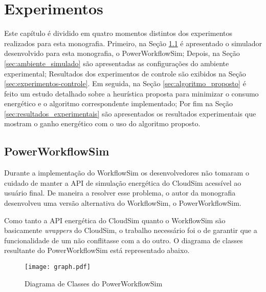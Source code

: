 \chapter{Experimentos}
\label{cap:experimentos}
Este capítulo é dividido em quatro momentos distintos dos experimentos realizados
para esta monografia. Primeiro, na Seção \ref{sec:powerworkflowsim} é
apresentado o simulador desenvolvido para esta monografia, o PowerWorkflowSim;
Depois, na Seção \ref{sec:ambiente_simulado} são
apresentadas as configurações do ambiente experimental; Resultados dos 
experimentos de controle são exibidos na Seção \ref{sec:experimentos-controle}.
Em seguida, na Seção
\ref{sec:algoritmo_proposto} é feito um estudo detalhado sobre a heurística
proposta para minimizar o consumo energético e o algoritmo correspondente
implementado; Por fim na Seção \ref{sec:resultados_experimentais} são
apresentados os resultados experimentais que mostram o ganho energético com
o uso do algoritmo proposto.

\section{PowerWorkflowSim}
\label{sec:powerworkflowsim}
Durante a implementação do WorkflowSim os desenvolvedores não tomaram o cuidado
de manter a API de simulação energética do CloudSim acessível ao usuário final.
De maneira a resolver esse problema, o autor da monografia desenvolveu uma versão
alternativa do WorkflowSim, o PowerWorkflowSim.

Como tanto a API energética do CloudSim quanto o WorkflowSim são basicamente 
\emph{wrappers} do CloudSim, o trabalho necessário foi o de garantir que 
a funcionalidade de um não conflitasse com a do outro. O diagrama de classes
resultante do PowerWorkflowSim está representado abaixo.

\begin{figure}[ht]
\centering
\texttt{[image: graph.pdf]}
\caption{Diagrama de Classes do PowerWorkflowSim}
\label{fig:classes_powerworkflowsim}
\end{figure}


